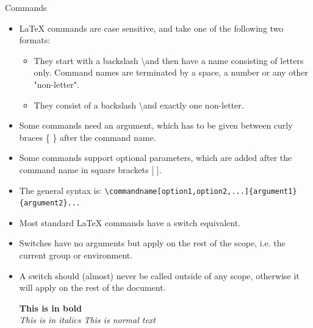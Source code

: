 \documentclass[style=lehigh,orient=landscape]{powerdot}
\begin{document}
\begin{wideslide}[bm={Commands},method=direct]{Commands}
  \begin{itemize}
  \item LaTeX commands are case sensitive, and take one of the following two formats:
    \begin{itemize}
    \item They start with a backslash \textbackslash and then have a name consisting of letters only. Command names are terminated by a space, a number or any other "non-letter".
    \item They consist of a backslash \textbackslash and exactly one non-letter.
    \end{itemize}
  \item Some commands need an argument, which has to be given between curly braces \{ \} after the command name. 
  \item Some commands support optional parameters, which are added after the command name in square brackets [ ]. 
  \item The general syntax is:
    \lstinline|\commandname[option1,option2,...]{argument1}{argument2}...|
  \item Most standard LaTeX commands have a switch equivalent. 
  \item Switches have no arguments but apply on the rest of the scope, i.e. the current group or environment. 
  \item A switch should (almost) never be called outside of any scope, otherwise it will apply on the rest of the document.
    \begin{LTXexample}[numbers=none,pos=r]
{\bf This is in bold}\\
\em This is in italics
This is normal text
  \end{LTXexample}
  \end{itemize}	
\end{wideslide}
\end{document}
